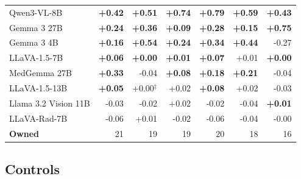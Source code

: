 \documentclass{article}
\begin{document}
\begin{table}[htbp]
\begin{tabular}{lrrrrrr}
Qwen3-VL-8B & \cellcolor{cfTerra4}\textbf{+0.42} & \cellcolor{cfTerra4}\textbf{+0.51} & \cellcolor{cfTerra4}\textbf{+0.74} & \cellcolor{cfTerra4}\textbf{+0.79} & \cellcolor{cfTerra4}\textbf{+0.59} & \cellcolor{cfTerra4}\textbf{+0.43} \\
Gemma 3 27B & \cellcolor{cfTerra3}\textbf{+0.24} & \cellcolor{cfTerra4}\textbf{+0.36} & \cellcolor{cfTerra2}\textbf{+0.09} & \cellcolor{cfTerra4}\textbf{+0.28} & \cellcolor{cfTerra3}\textbf{+0.15} & \cellcolor{cfTerra4}\textbf{+0.75} \\
Gemma 3 4B & \cellcolor{cfTerra3}\textbf{+0.16} & \cellcolor{cfTerra4}\textbf{+0.54} & \cellcolor{cfTerra3}\textbf{+0.24} & \cellcolor{cfTerra4}\textbf{+0.34} & \cellcolor{cfTerra4}\textbf{+0.44} & \cellcolor{cfSlate4}-0.27 \\
LLaVA-1.5-7B & \cellcolor{cfTerra2}\textbf{+0.06} & \cellcolor{cfTerra1}\textbf{+0.00} & \cellcolor{cfTerra1}\textbf{+0.01} & \cellcolor{cfTerra2}\textbf{+0.07} & \cellcolor{cfTerra1}+0.01 & \cellcolor{cfTerra1}\textbf{+0.00} \\
MedGemma 27B & \cellcolor{cfTerra4}\textbf{+0.33} & \cellcolor{cfSlate2}-0.04 & \cellcolor{cfTerra2}\textbf{+0.08} & \cellcolor{cfTerra3}\textbf{+0.18} & \cellcolor{cfTerra3}\textbf{+0.21} & \cellcolor{cfSlate2}-0.04 \\
LLaVA-1.5-13B & \cellcolor{cfTerra2}\textbf{+0.05} & \cellcolor{cfTerra1}+0.00$^{\ddagger}$ & \cellcolor{cfTerra1}+0.02 & \cellcolor{cfTerra2}\textbf{+0.08} & \cellcolor{cfTerra1}+0.02 & \cellcolor{cfSlate2}-0.03 \\
Llama 3.2 Vision 11B & \cellcolor{cfSlate2}-0.03 & \cellcolor{cfSlate2}-0.02 & \cellcolor{cfTerra2}+0.02 & \cellcolor{cfSlate1}-0.02 & \cellcolor{cfSlate2}-0.04 & \cellcolor{cfTerra1}\textbf{+0.01} \\
LLaVA-Rad-7B & \cellcolor{cfSlate2}-0.06 & \cellcolor{cfTerra1}+0.01 & \cellcolor{cfSlate2}-0.02 & \cellcolor{cfSlate2}-0.06 & \cellcolor{cfSlate2}-0.04 & \cellcolor{cfSlate1}-0.00 \\
\midrule
\textbf{Owned} & 21 & 19 & 19 & 20 & 18 & 16 \\
\bottomrule
\end{tabular}
\end{table}

\FloatBarrier

\subsection{Controls}
\label{app:cf-controls-sec}
\end{document}
